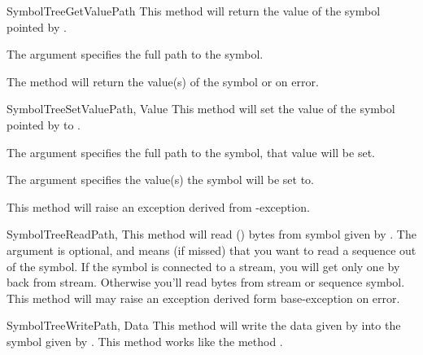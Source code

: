 \begin{methoddesc}[Core]{SymbolTreeGetValue}{Path}
This method will return the value of the symbol pointed by .

The argument  specifies the full path to the symbol. 

The method will return the value(s) of the symbol or  on error.
\end{methoddesc}


\begin{methoddesc}[Core]{SymbolTreeSetValue}{Path, Value}
This method will set the value of the symbol pointed by  to .

The argument  specifies the full path to the symbol, that value will be set.

The argument  specifies the value(s) the symbol will be set to.

This method will raise an exception derived from -exception. 
\end{methoddesc}


\begin{methoddesc}[Core]{SymbolTreeRead}{Path, }
This method will read () bytes from symbol given by . 
The argument  is optional, and means (if missed) that you want
to read a sequence out of the symbol. If the symbol is connected to a stream,
you will get only one by back from stream. Otherwise you'll read  
bytes from stream or sequence symbol. This method will may raise an exception 
derived form  base-exception on error.
\end{methoddesc}


\begin{methoddesc}[Core]{SymbolTreeWrite}{Path, Data}
This method will write the data given by  into the
symbol given by . This method works like the method
.
\end{methoddesc}


